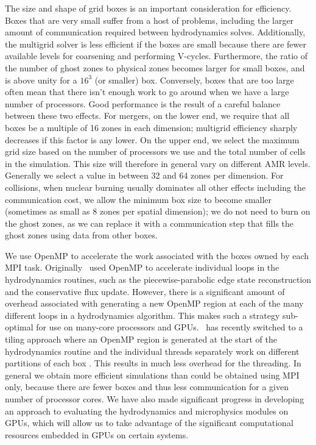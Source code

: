 \documentclass[12pt]{article}
\begin{document}
The size and shape of grid boxes is an important consideration for efficiency.
Boxes that are very small suffer from a host of problems, including the larger
amount of communication required between hydrodynamics solves. Additionally,
the multigrid solver is less efficient if the boxes are small because there
are fewer available levels for coarsening and performing V-cycles. Furthermore,
the ratio of the number of ghost zones to physical zones becomes larger for small
boxes, and is above unity for a $16^3$ (or smaller) box. Conversely, boxes that are too large
often mean that there isn't enough work to go around when we
have a large number of processors. Good performance is the result of a careful
balance between these two effects. For mergers, on the lower end, we require that
all boxes be a multiple of 16 zones in each dimension; multigrid efficiency sharply
decreases if this factor is any lower. On the upper end, we select the maximum grid size
based on the number of processors we use and the total number of cells in the
simulation. This size will therefore in general vary on different AMR levels.
Generally we select a value in between 32 and 64 zones per dimension. For collisions,
when nuclear burning usually dominates all other effects including the communication cost,
we allow the minimum box size to become smaller (sometimes as small as 8 zones per
spatial dimension); we do not need to burn on the ghost zones, as we can replace it with
a communication step that fills the ghost zones using data from other boxes.

We use OpenMP to accelerate the work associated with the boxes owned
by each MPI task. Originally \castro\ used OpenMP to accelerate
individual loops in the hydrodynamics routines, such as the
piecewise-parabolic edge state reconstruction and the conservative
flux update. However, there is a significant amount of overhead
associated with generating a new OpenMP region at each of the many
different loops in a hydrodynamics algorithm. This makes such a
strategy sub-optimal for use on many-core processors and GPUs. \castro\ has
recently switched to a tiling approach where an OpenMP region is
generated at the start of the hydrodynamics routine and the individual
threads separately work on different partitions of each box \citep{boxlib-tiling}. This
results in much less overhead for the threading. In general we obtain
more efficient simulations than could be obtained using MPI only,
because there are fewer boxes and thus less communication for a given
number of processor cores. We have also made significant progress in
developing an approach to evaluating the hydrodynamics and microphysics modules on GPUs,
which will allow us to take advantage of the significant computational resources embedded in
GPUs on certain systems.
\end{document}
